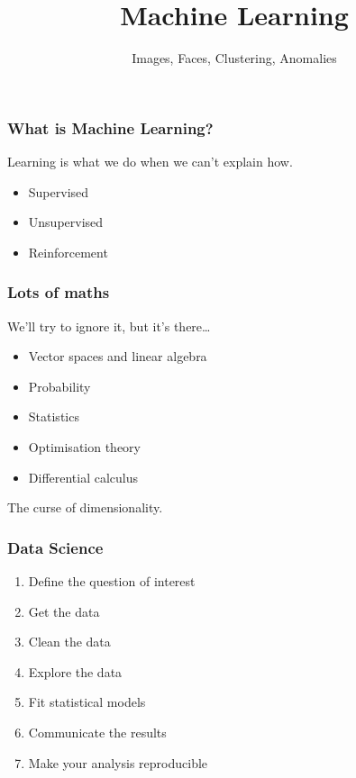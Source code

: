 
\title{Machine Learning}
\subtitle{Images, Faces, Clustering, Anomalies}




\begin{frame}
  \titlepage
\end{frame}


\begin{frame}
\end{frame}

\begin{frame}
  \frametitle{What is Machine Learning?}
  Learning is what we do when we can't explain how.
  \begin{itemize}
  \item Supervised
  \item Unsupervised
  \item Reinforcement
  \end{itemize}
\end{frame}

\begin{frame}
  \frametitle{Lots of maths}
  We'll try to ignore it, but it's there\dots
  \begin{itemize}
  \item Vector spaces and linear algebra
  \item Probability
  \item Statistics
  \item Optimisation theory
  \item Differential calculus
  \end{itemize}
  The curse of dimensionality.
\end{frame}

\begin{frame}
  \frametitle{Data Science}
  \begin{enumerate}
  \item Define the question of interest
  \item Get the data
  \item Clean the data
  \item Explore the data
  \item Fit statistical models
  \item Communicate the results
  \item Make your analysis reproducible
  \end{enumerate}
\end{frame}

